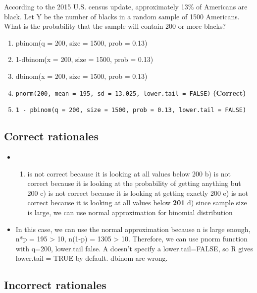 \documentclass[letterpaper,9pt,twoside,printwatermark=false]{pinp}
\providecommand{\tightlist}{%
  \setlength{\itemsep}{0pt}\setlength{\parskip}{0pt}}
\begin{document}
According to the 2015 U.S. census update, approximately 13\% of
Americans are black. Let Y be the number of blacks in a random sample of
1500 Americans. What is the probability that the sample will contain 200
or more blacks?

\begin{enumerate}
\def\labelenumi{\alph{enumi}.}
\tightlist
\item
  pbinom(q = 200, size = 1500, prob = 0.13)
\item
  1-dbinom(x = 200, size = 1500, prob = 0.13)
\item
  dbinom(x = 200, size = 1500, prob = 0.13)
\item
  \texttt{pnorm(200, mean = 195, sd = 13.025, lower.tail = FALSE)}
  \textbf{(Correct)}
\item
  \texttt{1 - pbinom(q = 200, size = 1500, prob = 0.13, lower.tail = FALSE)}
\end{enumerate}

\hypertarget{correct-rationales-12}{%
\subsection{Correct rationales}\label{correct-rationales-12}}

\begin{itemize}
\item
  \begin{enumerate}
  \def\labelenumi{\alph{enumi})}
  \tightlist
  \item
    is not correct because it is looking at all values below 200 b) is
    not correct because it is looking at the probability of getting
    anything but 200 c) is not correct because it is looking at getting
    exactly 200 e) is not correct because it is looking at all values
    below \textbf{201} d) since sample size is large, we can use normal
    approximation for binomial distribution
  \end{enumerate}
\item
  In this case, we can use the normal approximation because n is large
  enough, n*p = 195 \textgreater{} 10, n(1-p) = 1305 \textgreater{} 10.
  Therefore, we can use pnorm function with q=200, lower.tail false. A
  doesn't specify a lower.tail=FALSE, so R gives lower.tail = TRUE by
  default. dbinom are wrong.
\end{itemize}

\hypertarget{incorrect-rationales-12}{%
\subsection{Incorrect rationales}\label{incorrect-rationales-12}}
\end{document}

